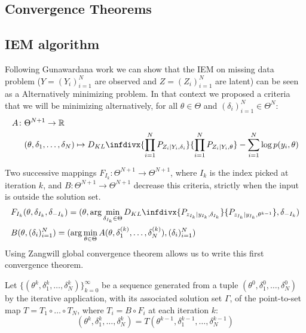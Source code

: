 \documentclass[a0,portrait]{a0poster}
\newcommand{\infdiv}{D_{KL}\infdivx}
\begin{document}
\begin{multicols}{2}
\section{Convergence Theorems}
   
\subsection{IEM algorithm}
Following Gunawardana work we can show that the IEM on missing data problem ($Y=(Y_i)_{i=1}^N$ are observed and $Z=(Z_i)_{i=1}^N$ are latent) can be seen as a Alternatively minimizing problem. In that context we proposed a criteria that we will be minimizing alternatively, for all $\theta \in \Theta$ and $(\delta_i)_{i=1}^N \in \Theta^N$:
\begin{align*}
  A \colon & \Theta^{N+1} \to \mathbb{R}\\
  & (\theta, \delta_1,\dots,\delta_N) \mapsto \infdiv{\prod_{i=1}^{N}{P_{Z_i|Y_i,\delta_i}}}{\prod_{i=1}^{N}{P_{Z_i|Y_i,\theta}}} - \sum_{i=1}^{N}{\log p(y_i,\theta)}
\end{align*}

Two successive mappings $ F_{I_k} \colon \Theta^{N+1} \to \Theta^{N+1}$, where $I_k$ is the index picked at iteration $k$, and $ B \colon \Theta^{N+1} \to \Theta^{N+1}$ decrease this criteria, strictly when the input is outside the solution set.
\begin{align*}
& F_{I_k}(\theta,\delta_{I_k},\delta_{-I_k}) = (\theta,\arg \min \limits_{\delta_{I_k} \in \Theta}  \infdiv{P_{z_{I_{k}}|y_{I_{k}},\delta_{I_k}}}{P_{z_{I_{k}}|y_{I_{k}},\theta^{k-1}}},\delta_{-I_k})\\
& B(\theta,(\delta_i)_{i=1}^N) = (\arg \min\limits_{\theta \in \Theta}A(\theta,\delta_1^{(k)},\dots, \delta_N^{(k)}),(\delta_i)_{i=1}^N)
\end{align*}
Using Zangwill global convergence theorem allows us to write this first convergence theorem.

Let $\{(\theta^k, \delta_1^k,\dots, \delta_N^k)\}_{k=0}^{\infty}$ be a sequence generated from a tuple $(\theta^0, \delta_1^0,\dots, \delta_N^0)$ by the iterative application, with its associated solution set $\Gamma$, of the point-to-set map $T = T_{1}\circ \dots \circ T_{N}$, where $T_{i} = B \circ F_{i}$ at each iteration $k$:
\begin{equation*}
(\theta^k, \delta_1^k,\dots, \delta_N^k) = T(\theta^{k-1}, \delta_1^{k-1},\dots, \delta_N^{k-1})
\end{equation*}



\end{multicols}
\end{document}
